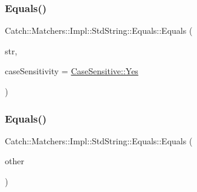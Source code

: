 \subsubsection{\texorpdfstring{Equals()}{Equals()}\hspace{0.1cm}{\footnotesize\ttfamily [1/2]}}
{\footnotesize\ttfamily Catch\+::\+Matchers\+::\+Impl\+::\+Std\+String\+::\+Equals\+::\+Equals (\begin{DoxyParamCaption}\item[{std\+::string const \&}]{str,  }\item[{\hyperlink{struct_catch_1_1_case_sensitive_aad49d3aee2d97066642fffa919685c6a}{Case\+Sensitive\+::\+Choice}}]{case\+Sensitivity = {\ttfamily \hyperlink{struct_catch_1_1_case_sensitive_aad49d3aee2d97066642fffa919685c6aa7c5550b69ec3c502e6f609b67f9613c6}{Case\+Sensitive\+::\+Yes}} }\end{DoxyParamCaption})\hspace{0.3cm}{\ttfamily [inline]}}

\hypertarget{struct_catch_1_1_matchers_1_1_impl_1_1_std_string_1_1_equals_acaa97de06aedf363ae803d65a975f5e4}{}\label{struct_catch_1_1_matchers_1_1_impl_1_1_std_string_1_1_equals_acaa97de06aedf363ae803d65a975f5e4} 
\subsubsection{\texorpdfstring{Equals()}{Equals()}\hspace{0.1cm}{\footnotesize\ttfamily [2/2]}}
{\footnotesize\ttfamily Catch\+::\+Matchers\+::\+Impl\+::\+Std\+String\+::\+Equals\+::\+Equals (\begin{DoxyParamCaption}\item[{\hyperlink{struct_catch_1_1_matchers_1_1_impl_1_1_std_string_1_1_equals}{Equals} const \&}]{other }\end{DoxyParamCaption})\hspace{0.3cm}{\ttfamily [inline]}}

\hypertarget{struct_catch_1_1_matchers_1_1_impl_1_1_std_string_1_1_equals_ad34af04f636ec84d7c613ead32f20c3f}{}\label{struct_catch_1_1_matchers_1_1_impl_1_1_std_string_1_1_equals_ad34af04f636ec84d7c613ead32f20c3f} 
